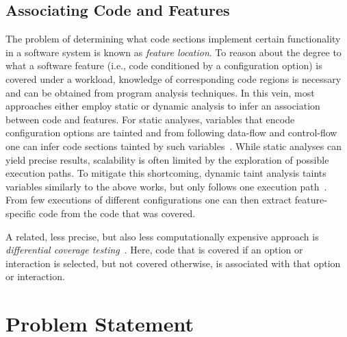 \subsection{Associating Code and Features}\label{sec:feature_location}
The problem of determining what code sections implement certain functionality in a software system is known as \emph{feature location}. To reason about the degree to what a software feature (i.e., code conditioned by a configuration option) is covered under a workload, knowledge of corresponding code regions is necessary and can be obtained from program analysis techniques.
In this vein, most approaches either employ static or dynamic analysis to infer an association between code and features. For static analyses, variables that encode configuration options are tainted and from following data-flow and control-flow one can infer code sections tainted by such variables~\cite{velez_2020_configcrusher_jase,lillack_2018_lotrack_tse,luo_2019_cova}.
While static analyses can yield precise results, scalability is often limited by the exploration of possible execution paths. To mitigate this shortcoming, dynamic taint analysis taints variables similarly to the above works, but only follows one execution path~\cite{bell_phosphor_2014,velez_comprex_2021,splat_kim_2013}. From few executions of different configurations one can then extract feature-specific code from the code that was covered. 

{\color{red}A related, less precise, but also less computationally expensive approach is \emph{differential coverage testing}~\cite{wong_integrated_2005,wilde_early_1996,agrawal_fault_1995,simmons_industrial_2006,chen_dynamic_nodate,sherwood_reducing_nodate}. Here, code that is covered if an option or interaction is selected, but not covered otherwise, is associated with that option or interaction.}
	




\section{Problem Statement}

